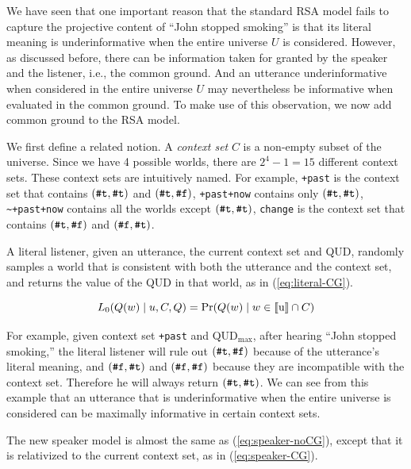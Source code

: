 We have seen that one important reason that the standard RSA model fails to 
 capture the projective content of ``John stopped smoking'' is that its literal
 meaning is underinformative when the entire universe $U$ is considered.
However, as discussed before, there can be information taken for granted by the
 speaker and the listener, i.e., the common ground. 
And an utterance underinformative when considered in the entire universe $U$ may 
 nevertheless be informative when evaluated in the common ground.
To make use of this observation, we now add common ground to the RSA model.

We first define a related notion. 
A \emph{context set} \cite{Stalnaker1974:Pragmatic-Presuppositions} $C$ is a non-empty subset of the universe.
Since we have 4 possible worlds, there are $2^4-1=15$ different context sets.
These context sets are intuitively named. 
For example, \verb=+past= is the context set
 that contains $(\verb+#t+, \verb+#t+)$ and $(\verb+#t+, \verb+#f+)$,
\verb=+past+now= contains only $(\verb+#t+, \verb+#t+)$,
\verb=~+past+now= contains all the worlds except $(\verb+#t+, \verb+#t+)$, 
\verb=change= is the context set that contains $(\verb+#t+, \verb+#f+)$ 
 and $(\verb+#f+, \verb+#t+)$.

A literal listener, given an utterance, the current context set and QUD, 
 randomly samples a world that is consistent with both the utterance and 
 the context set, and returns the value of the QUD in that world, as in  
 (\ref{eq:literal-CG}).

\begin{equation}
L_0(Q(w) \mid u, C, Q) = \Pr(Q(w) \mid w \in \llbracket \text{u} \rrbracket \cap C) \label{eq:literal-CG}
\end{equation}

For example, given context set \verb=+past= and QUD$_\text{max}$, 
 after hearing ``John stopped smoking,'' the literal listener will rule out 
 $(\verb+#t+, \verb+#f+)$ because of the utterance's literal meaning, and 
 $(\verb+#f+, \verb+#t+)$ and $(\verb+#f+, \verb+#f+)$ because 
 they are incompatible with the context set.
Therefore he will always return $(\verb+#t+, \verb+#t+)$.
We can see from this example that an utterance that is underinformative 
 when the entire universe is considered can be maximally informative in certain 
 context sets.

The new speaker model is almost the same as (\ref{eq:speaker-noCG}), except that 
 it is relativized to the current context set, as in (\ref{eq:speaker-CG}).
 
